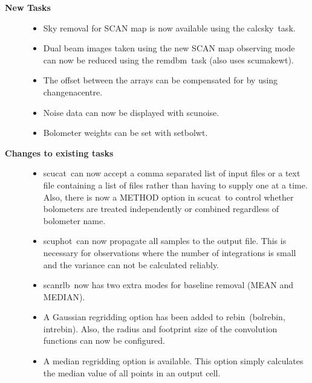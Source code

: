 \documentclass[twoside,11pt]{article}
\newcommand{\task}[1]{{\sf #1}}
\newcommand{\rebin}{\htmlref{\task{rebin}}{REBIN}}
\newcommand{\bolrebin}{\htmlref{\task{bolrebin}}{BOLREBIN}}
\newcommand{\intrebin}{\htmlref{\task{intrebin}}{INTREBIN}}
\newcommand{\calcsky}{\htmlref{\task{calcsky}}{CALCSKY}}
\newcommand{\scuphot}{\htmlref{\task{scuphot}}{SCUPHOT}}
\newcommand{\scucat}{\htmlref{\task{scucat}}{SCUCAT}}
\newcommand{\scanrlb}{\htmlref{\task{scan\_rlb}}{SCAN_RLB}}
\newcommand{\remdbm}{\htmlref{\task{remdbm}}{REMDBM}}
\newcommand{\scumakewt}{\htmlref{\task{scumakewt}}{SCUMAKEWT}}
\newcommand{\chgnacent}{\htmlref{\task{change\_nacentre}}{CHANGE_NACENTRE}}
\newcommand{\scunoise}{\htmlref{\task{scunoise}}{SCUNOISE}}
\newcommand{\setbolwt}{\htmlref{\task{setbolwt}}{SETBOLWT}}
\newcommand{\htmlref}[2]{#1}
\renewcommand{\_}{\texttt{\symbol{95}}}
\begin{document}
\begin{description}

\item[\textbf{New Tasks}] \mbox{}

\begin{itemize}
\item Sky removal for SCAN map is now available using the \calcsky\ task.

\item Dual beam images taken using the new SCAN map observing mode can now be
reduced using the \remdbm\ task (also uses \scumakewt).

\item The offset between the arrays can be compensated for by using
\chgnacent. 

\item Noise data can now be displayed with \scunoise.

\item Bolometer weights can be set with \setbolwt. 

\end{itemize}

\item[\textbf{Changes to existing tasks}] \mbox{}

\begin{itemize}

\item \scucat\ can now accept a comma separated list of input files
or a text file containing a list of files rather than having to supply one
at a time. Also, there is now a METHOD option in \scucat\ to control whether
bolometers are treated independently or combined regardless of bolometer name.

\item \scuphot\ can now propagate all samples to the output file. This is
necessary for observations where the number of integrations is small and the
variance can not be calculated reliably.

\item \scanrlb\ now has two extra modes for baseline removal (MEAN and
MEDIAN). 

\item A Gaussian regridding option has been added to \rebin\ (\bolrebin,
\intrebin). Also, the radius and footprint size of the convolution functions
can now be configured.

\item A median regridding option is available. This option simply calculates
the median value of all points in an output cell.


\end{itemize}
\end{description}
\end{document}
